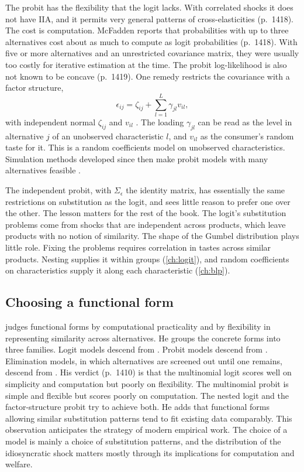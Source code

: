 The probit has the flexibility that the logit lacks. With correlated shocks it does not have IIA, and it
permits very general patterns of cross-elasticities (p.~1418). The cost is computation. McFadden reports that
probabilities with up to three alternatives cost about as much to compute as logit probabilities (p.~1418).
With five or more alternatives and an unrestricted covariance matrix, they were usually too costly for iterative
estimation at the time. The probit log-likelihood is also not known to be concave (p.~1419). One remedy restricts the
covariance with a factor structure,
\begin{equation*}
\epsilon_{ij} = \zeta_{ij} + \sum_{l=1}^{L}\gamma_{jl}v_{il},
\end{equation*}
with independent normal $\zeta_{ij}$ and $v_{il}$ \citep[eq.~3.25, p.~1419]{McFadden1984}. The loading $\gamma_{jl}$ can
be read as the level in alternative $j$ of an unobserved characteristic $l$, and $v_{il}$ as the consumer's random
taste for it. This is a random coefficients model on unobserved characteristics. Simulation methods developed
since then make probit models with many alternatives feasible \citep{Train2009}.

The independent probit, with $\Sigma_\epsilon$ the identity matrix, has essentially the same restrictions on
substitution as the logit, and \citet[p.~1420]{McFadden1984} sees little reason to prefer one over the other.
The lesson matters for the rest of the book. The logit's substitution problems come from shocks that are
independent across products, which leave products with no notion of similarity. The shape of the Gumbel
distribution plays little role. Fixing the problems requires correlation in tastes across similar products. Nesting supplies it within
groups (\cref{ch:logit}), and random coefficients on characteristics supply it along each characteristic
(\cref{ch:blp}).

\subsection{Choosing a functional form}\label{sec:06-forms}

\citet[sec.~3.3]{McFadden1984} judges functional forms by computational practicality and by flexibility in
representing similarity across alternatives. He groups the concrete forms into three families. Logit models
descend from \citet{Luce1959}. Probit models descend from \citet{Thurstone1927}. Elimination models, in which
alternatives are screened out until one remains, descend from \citet{Tversky1972}. His verdict (p.~1410) is that
the multinomial logit scores well on simplicity and computation but poorly on flexibility. The multinomial
probit is simple and flexible but scores poorly on computation. The nested logit and the factor-structure probit
try to achieve both. He adds that functional forms allowing similar substitution patterns tend to fit existing
data comparably. This observation anticipates the strategy of modern empirical work. The choice of a model is
mainly a choice of substitution patterns, and the distribution of the idiosyncratic shock matters mostly through
its implications for computation and welfare.

